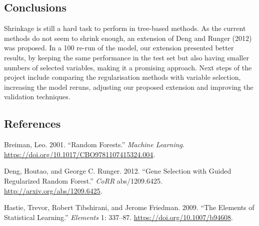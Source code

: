 \documentclass[]{article}
\begin{document}
\subsection*{Conclusions}

Shrinkage is still a hard task to perform in tree-based methods. As the
current methods do not seem to shrink enough, an extension of Deng and
Runger (2012) was proposed. In a 100 re-run of the model, our extension
presented better results, by keeping the same performance in the test
set but also having smaller numbers of selected variables, making it a
promising approach. Next steps of the project include comparing the
regularisation methods with variable selection, increasing the model
reruns, adjusting our proposed extension and improving the validation
techniques.

\subsection*{References}
\small

\hypertarget{refs}{}
\leavevmode\hypertarget{ref-Breiman2001}{}%
Breiman, Leo. 2001. ``Random Forests.'' \emph{Machine Learning}.
\url{https://doi.org/10.1017/CBO9781107415324.004}.

\leavevmode\hypertarget{ref-guided}{}%
Deng, Houtao, and George C. Runger. 2012. ``Gene Selection with Guided
Regularized Random Forest.'' \emph{CoRR} abs/1209.6425.
\url{http://arxiv.org/abs/1209.6425}.

\leavevmode\hypertarget{ref-HastieTrevor}{}%
Hastie, Trevor, Robert Tibshirani, and Jerome Friedman. 2009. ``The
Elements of Statistical Learning.'' \emph{Elements} 1: 337--87.
\url{https://doi.org/10.1007/b94608}.
\end{document}
